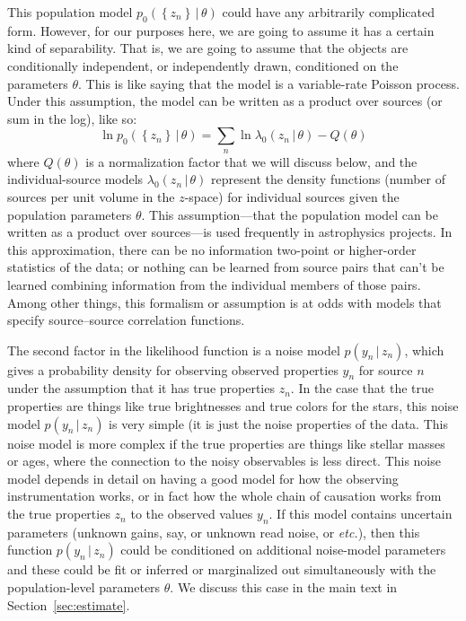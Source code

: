 \documentclass[modern]{aastex62}
\newcommand{\given}{\,|\,}
\newcommand{\set}[1]{\left\{{#1}\right\}}
\newcommand{\sectionname}{Section}
\newcommand{\foreign}[1]{\textsl{#1}}
\begin{document}
This population model $p_0(\set{z_n}\given\theta)$ could have any arbitrarily
complicated form.
However, for our purposes here, we are going to assume it has a certain kind
of separability.
That is, we are going to assume that the objects are conditionally independent,
or independently drawn, conditioned on the parameters $\theta$.
This is like saying that the model is a variable-rate Poisson process.
Under this assumption, the model can be written as a product over sources (or sum in the log), like so:
\begin{equation}
\ln p_0(\set{z_n}\given\theta) = \sum_n \ln \lambda_0(z_n\given\theta) - Q(\theta)
\end{equation}
where $Q(\theta)$ is a normalization factor that we will discuss below,
and the
individual-source models $\lambda_0(z_n\given\theta)$ represent the
density functions (number of sources per unit volume in the $z$-space)
for individual sources given the population parameters $\theta$.
This assumption---that the population model can be written as a product over
sources---is used frequently in astrophysics projects.
In this approximation, there can be no information two-point or
higher-order statistics of the data; or nothing can be learned from
source pairs that can't be learned combining information from the
individual members of those pairs.
Among other things, this formalism or assumption is at odds with
models that specify source--source correlation functions.

The second factor in the likelihood function is
a noise model $p(y_n\given z_n)$, which gives a probability density for
observing observed properties $y_n$ for source $n$ under the assumption
that it has true properties $z_n$.
In the case that the true properties are things like true brightnesses
and true colors for the stars, this noise model $p(y_n\given z_n)$ is
very simple (it is just the noise properties of the data.
This noise model is more complex if the true properties are things like
stellar masses or ages, where the connection to the noisy observables is
less direct.
This noise model depends in detail on having a good model for how the
observing instrumentation works, or in fact how the whole chain of causation
works from the true properties $z_n$ to the observed values $y_n$.
If this model contains uncertain parameters (unknown gains, say, or
unknown read noise, or \foreign{etc.}), then this function
$p(y_n\given z_n)$ could be conditioned on additional noise-model
parameters and these could be fit or inferred or marginalized out
simultaneously with the population-level parameters $\theta$.
We discuss this case in the main text in \sectionname~\ref{sec:estimate}.
\end{document}
